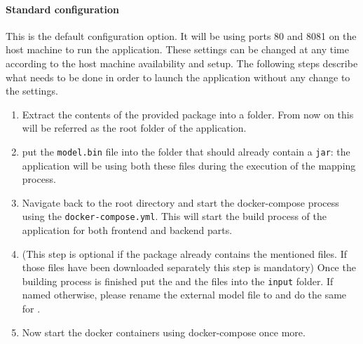 \documentclass{scrreprt}
\begin{document}
\paragraph{Standard configuration} This is the default configuration option. It will be using ports 80 and 8081 on the host machine to run the application. These settings can be changed at any time according to the host machine availability and setup. The following steps describe what needs to be done in order to launch the application without any change to the settings.
\begin{enumerate}
	\item Extract the contents of the provided package into a folder. From now on this will be referred as the root folder of the application.
	\item put the \texttt{model.bin} file into the  folder that should already contain a \texttt{jar}: the application will be using both these files during the execution of the mapping process.
	\item Navigate back to the root directory and start the docker-compose process using the \texttt{docker-compose.yml}. This will start the build process of the application for both frontend and backend parts.	
	\item (This step is optional if the package already contains the mentioned files. If those files have been downloaded separately this step is mandatory) Once the building process is finished put the \jaxb \space and the \model \space files into the \texttt{input} folder. If named otherwise, please rename the external model file to \model \space and do the same for \jaxb.
	\item Now start the docker containers using docker-compose once more.
\end{enumerate}
\end{document}
